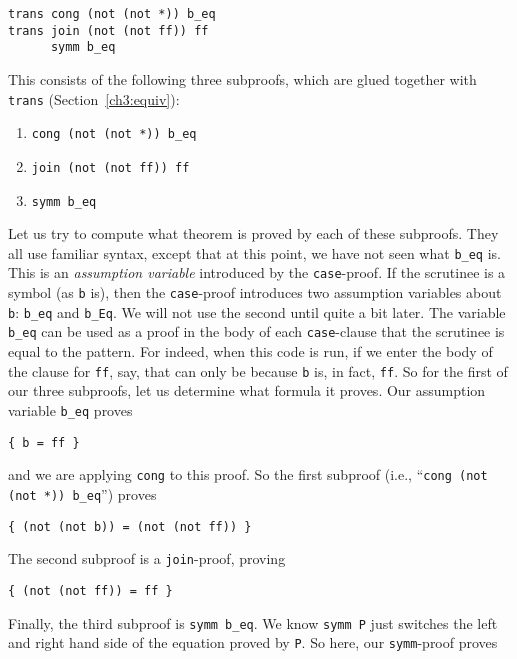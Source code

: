 \documentclass{book}[12pt]
\begin{document}
\begin{verbatim}
trans cong (not (not *)) b_eq
trans join (not (not ff)) ff
      symm b_eq
\end{verbatim}

 \noindent This consists of the following three subproofs, which are
glued together with \texttt{trans} (Section~\ref{ch3:equiv}):

\begin{enumerate}
\item \texttt{cong (not (not *)) b\_eq}
\item \texttt{join (not (not ff)) ff}
\item \texttt{symm b\_eq}
\end{enumerate}

\noindent Let us try to compute what theorem is proved by each of
these subproofs.  They all use familiar syntax, except that at this
point, we have not seen what \texttt{b\_eq} is.  This is an
\emph{assumption variable} introduced by the \texttt{case}-proof.  If
the scrutinee is a symbol (as \texttt{b} is), then the
\texttt{case}-proof introduces two assumption variables about
\texttt{b}: \texttt{b\_eq} and \texttt{b\_Eq}.  We will not use the
second until quite a bit later.  The variable \texttt{b\_eq} can be
used as a proof in the body of each \texttt{case}-clause that the
scrutinee is equal to the pattern.  For indeed, when this code is run,
if we enter the body of the clause for \texttt{ff}, say, that can only
be because \texttt{b} is, in fact, \texttt{ff}.  So for the first
of our three subproofs, let us determine what formula it proves.
Our assumption variable \texttt{b\_eq} proves

\begin{verbatim}
{ b = ff }
\end{verbatim}

\noindent and we are applying \texttt{cong} to this proof.  So the
first subproof (i.e., ``\texttt{cong (not (not *)) b\_eq}'') proves

\begin{verbatim}
{ (not (not b)) = (not (not ff)) }
\end{verbatim}

\noindent The second subproof is a \texttt{join}-proof, proving

\begin{verbatim}
{ (not (not ff)) = ff }
\end{verbatim}

\noindent Finally, the third subproof is \texttt{symm b\_eq}.  We
know \texttt{symm P} just switches the left and right hand side
of the equation proved by \texttt{P}.  So here, our \texttt{symm}-proof
proves
\end{document}

